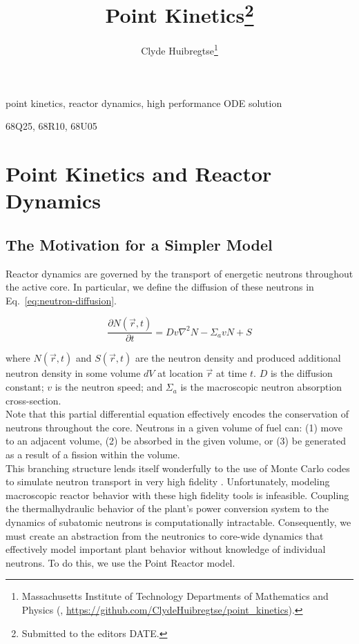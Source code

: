 \documentclass[review,onefignum,onetabnum]{siamart171218}
\title{Point Kinetics\thanks{Submitted to the editors DATE.}}
\author{Clyde Huibregtse\thanks{Massachusetts Institute of Technology Departments of Mathematics and Physics
  (\email{huibregc@mit.edu}, \url{https://github.com/ClydeHuibregtse/point_kinetics}).}}
\begin{document}
\maketitle

\begin{abstract}

\end{abstract}

\begin{keywords}
  point kinetics, reactor dynamics, high performance ODE solution
\end{keywords}

\begin{AMS}
  68Q25, 68R10, 68U05
\end{AMS}

\section{Point Kinetics and Reactor Dynamics}

\subsection{The Motivation for a Simpler Model}
Reactor dynamics are governed by the transport of energetic neutrons
throughout the active core. In particular, we define the diffusion
of these neutrons in Eq.~\cref{eq:neutron-diffusion}.

\begin{equation}
  \label{eq:neutron-diffusion}
  \frac{\partial N(\vec{r}, t)}{\partial t} = Dv\nabla^2N - \Sigma_a v N + S
\end{equation}

where $N(\vec{r}, t)$ and $S(\vec{r}, t)$ are the neutron density and produced
additional neutron density in some volume $dV$ at location
$\vec{r}$ at time $t$.  $D$ is the diffusion constant; $v$ is the neutron
speed; and $\Sigma_a$ is the macroscopic neutron absorption cross-section.\cite{Dynamics} \\

Note that this partial differential equation effectively encodes the
conservation of neutrons throughout the core. Neutrons in a given volume of
fuel can: (1) move to an adjacent volume, (2) be absorbed in the given
volume, or (3) be generated as a result of a fission within the volume.\\

This branching structure lends itself wonderfully to the use of
Monte Carlo codes to simulate neutron transport in very high fidelity \cite{Serpent}.
Unfortunately, modeling macroscopic reactor behavior with these high fidelity
tools is infeasible. Coupling the thermalhydraulic behavior of the plant's
power conversion system to the dynamics of subatomic neutrons is
computationally intractable. Consequently, we must create an abstraction from
the neutronics to core-wide dynamics that effectively model important plant
behavior without knowledge of individual neutrons. To do this, we use the
Point Reactor model.
\end{document}

